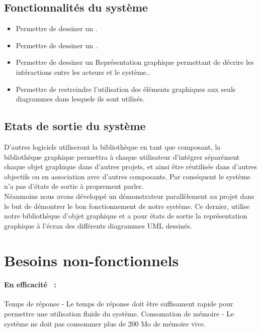 \documentclass[12pt,a4paper,openany]{report}
\begin{document}
	\subsection{Fonctionnalités du système}
	\begin{itemize}
		\item Permettre de dessiner un .
		\item Permettre de dessiner un .
		\item Permettre de dessiner un 
			{Représentation graphique permettant de décrire les intéractions entre les acteurs et le système.}.
		\item Permettre de restreindre l'utilisation des éléments graphiques aux seuls diagrammes dans lesquels ils sont utilisés.
	\end{itemize}
	\subsection{Etats de sortie du système}
	D'autres logiciels utiliseront la bibliothèque en tant que composant, la bibliothèque graphique
	permettra à chaque utilisateur d'intégrer séparément chaque objet graphique dans d'autres projets,
	et ainsi être réutilisée dans d'autres objectifs ou en association avec d'autres composants.
	Par conséquent le système n'a pas d'états de sortie à proprement parler.\\
	Néanmoins nous avons développé un démonstrateur parallèlement au projet dans le but de démontrer
	le bon fonctionnement de notre système.
	Ce dernier, utilise notre bibliothèque d'objet graphique et a pour états de sortie la représentation
	graphique à l'écran des différents diagrammes UML dessinés. %

	\section{Besoins non-fonctionnels}
		\paragraph{En efficacité~ :}
		Temps de réponse - Le temps de réponse doit être suffisament rapide pour permettre une utilisation fluide du système.
		Consomation de mémoire - Le système ne doit pas consommer plus de 200 Mo de mémoire vive.
\end{document}
